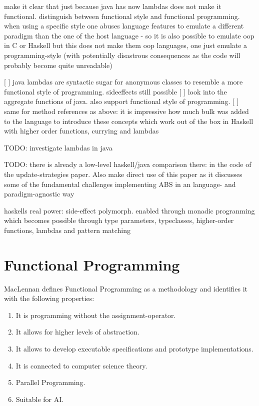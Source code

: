 make it clear that just because java has now lambdas does not make it functional. 
distinguish between functional style and functional programming. when using a specific style one abuses language features to emulate a different paradigm than the one of the host language - so it is also possible to emulate oop in C or Haskell but this does not make them oop languages, one just emulate a programming-style (with potentially disastrous consequences as the code will probably become quite unreadable)

[ ] java lambdas are syntactic sugar for anonymous classes to resemble a more functional style of programming. sideeffects still possible
[ ] look into the aggregate functions of java. also support functional style of programming.
[ ] same for method references as above: it is impressive how much bulk was added to the language to introduce these concepts which work out of the box in Haskell with higher order functions, currying and lambdas 

TODO: investigate lambdas in java

TODO: there is already a low-level haskell/java comparison there: in the code of the update-strategies paper. Also make direct use of this paper as it discusses some of the fundamental challenges implementing ABS in an language- and paradigm-agnostic way

haskells real power: side-effect polymorph. enabled through monadic progranming which becomes possible through type parameters, typeclasses, higher-order functions, lambdas and pattern matching

\section{Functional Programming}
MacLennan \cite{maclennan_functional_1990} defines Functional Programming as a methodology and identifies it with the following properties:

\begin{enumerate}
	\item It is programming without the assignment-operator.
	\item It allows for higher levels of abstraction.
	\item It allows to develop executable specifications and prototype implementations.
	\item It is connected to computer science theory.
	\item Parallel Programming.
	\item Suitable for AI.
\end{enumerate}


